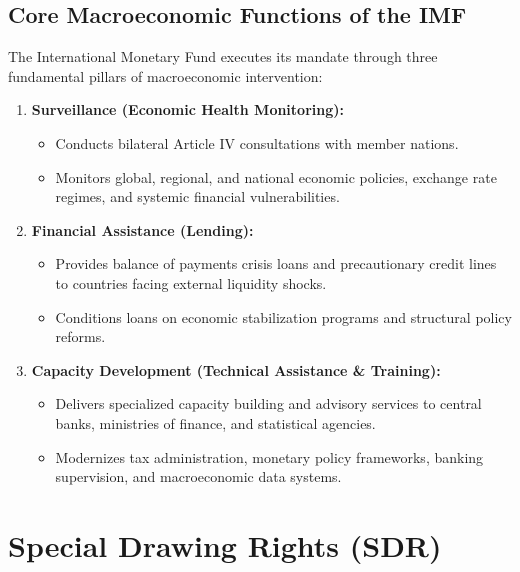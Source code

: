 \subsection{Core Macroeconomic Functions of the IMF}
The International Monetary Fund executes its mandate through three fundamental pillars of macroeconomic intervention:
\begin{enumerate}[leftmargin=*]
    \item \textbf{Surveillance (Economic Health Monitoring):}
    \begin{itemize}[noitemsep]
        \item Conducts bilateral Article IV consultations with member nations.
        \item Monitors global, regional, and national economic policies, exchange rate regimes, and systemic financial vulnerabilities.
    \end{itemize}

    \item \textbf{Financial Assistance (Lending):}
    \begin{itemize}[noitemsep]
        \item Provides balance of payments crisis loans and precautionary credit lines to countries facing external liquidity shocks.
        \item Conditions loans on economic stabilization programs and structural policy reforms.
    \end{itemize}

    \item \textbf{Capacity Development (Technical Assistance \& Training):}
    \begin{itemize}[noitemsep]
        \item Delivers specialized capacity building and advisory services to central banks, ministries of finance, and statistical agencies.
        \item Modernizes tax administration, monetary policy frameworks, banking supervision, and macroeconomic data systems.
    \end{itemize}
\end{enumerate}

\section{Special Drawing Rights (SDR)}

